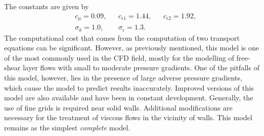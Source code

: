The constants are given by
\begin{align}
    & c_\mu = 0.09,   & & c_{\epsilon 1} = 1.44, & & c_{\epsilon 2} = 1.92, \\
    & \sigma_k = 1.0, & & \sigma_\epsilon = 1.3.  
\end{align}
The computational cost that comes from the computation of two transport equations can be significant. However, as previously mentioned, this model is one of the most commonly used in the CFD field, mostly for the modelling of free-shear layer flows with small to moderate pressure gradients. One of the pitfalls of this model, however, lies in the presence of large adverse pressure gradients, which cause the model to predict results inaccurately. Improved versions of this model are also available and have been in constant development. Generally, the use of fine grids is required near solid walls. Additional modifications are necessary for the treatment of viscous flows in the vicinity of walls. This model remains as the simplest \textit{complete} model.
